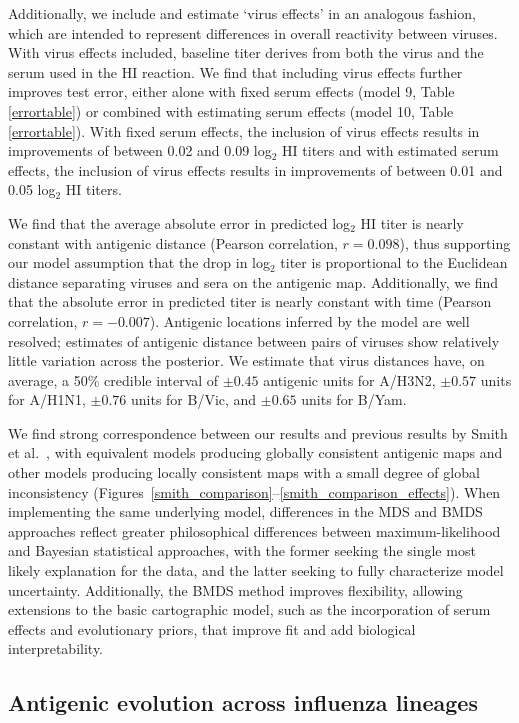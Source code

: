 \documentclass[11pt,oneside,letterpaper]{article}
\begin{document}
Additionally, we include and estimate `virus effects' in an analogous fashion, which are intended to represent differences in overall reactivity between viruses.
With virus effects included, baseline titer derives from both the virus and the serum used in the HI reaction.
We find that including virus effects further improves test error, either alone with fixed serum effects (model 9, Table \ref{errortable}) or combined with estimating serum effects (model 10, Table \ref{errortable}).
With fixed serum effects, the inclusion of virus effects results in improvements of between 0.02 and 0.09 log$_2$ HI titers and with estimated serum effects, the inclusion of virus effects results in improvements of between 0.01 and 0.05 log$_2$ HI titers.

We find that the average absolute error in predicted log$_2$ HI titer is nearly constant with antigenic distance (Pearson correlation, $r = 0.098$), thus supporting our model assumption that the drop in log$_2$ titer is proportional to the Euclidean distance separating viruses and sera on the antigenic map.
Additionally, we find that the absolute error in predicted titer is nearly constant with time (Pearson correlation, $r = -0.007$).
Antigenic locations inferred by the model are well resolved; estimates of antigenic distance between pairs of viruses show relatively little variation across the posterior.
We estimate that virus distances have, on average, a 50\% credible interval of $\pm0.45$ antigenic units for A/H3N2, $\pm0.57$ units for A/H1N1, $\pm0.76$ units for B/Vic, and $\pm0.65$ units for B/Yam.

We find strong correspondence between our results and previous results by Smith et al.\ \cite{Smith04}, with equivalent models producing globally consistent antigenic maps and other models producing locally consistent maps with a small degree of global inconsistency (Figures~\ref{smith_comparison}--\ref{smith_comparison_effects}).
When implementing the same underlying model, differences in the MDS and BMDS approaches reflect greater philosophical differences between maximum-likelihood and Bayesian statistical approaches, with the former seeking the single most likely explanation for the data, and the latter seeking to fully characterize model uncertainty.
Additionally, the BMDS method improves flexibility, allowing extensions to the basic cartographic model, such as the incorporation of serum effects and evolutionary priors, that improve fit and add biological interpretability.

\subsection*{Antigenic evolution across influenza lineages}
\end{document}
